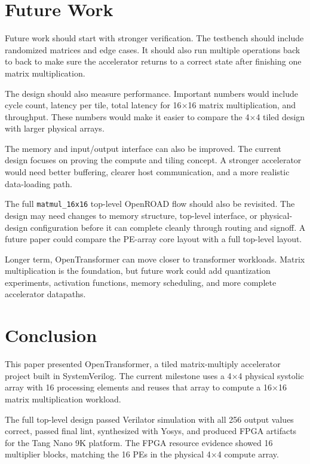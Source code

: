 \documentclass[conference]{IEEEtran}
\begin{document}
\section{Future Work}

Future work should start with stronger verification. The testbench should include randomized matrices and edge cases. It should also run multiple operations back to back to make sure the accelerator returns to a correct state after finishing one matrix multiplication.

The design should also measure performance. Important numbers would include cycle count, latency per tile, total latency for 16$\times$16 matrix multiplication, and throughput. These numbers would make it easier to compare the 4$\times$4 tiled design with larger physical arrays.

The memory and input/output interface can also be improved. The current design focuses on proving the compute and tiling concept. A stronger accelerator would need better buffering, clearer host communication, and a more realistic data-loading path.

The full \texttt{matmul\_16x16} top-level OpenROAD flow should also be revisited. The design may need changes to memory structure, top-level interface, or physical-design configuration before it can complete cleanly through routing and signoff. A future paper could compare the PE-array core layout with a full top-level layout.

Longer term, OpenTransformer can move closer to transformer workloads. Matrix multiplication is the foundation, but future work could add quantization experiments, activation functions, memory scheduling, and more complete accelerator datapaths.

\section{Conclusion}

This paper presented OpenTransformer, a tiled matrix-multiply accelerator project built in SystemVerilog. The current milestone uses a 4$\times$4 physical systolic array with 16 processing elements and reuses that array to compute a 16$\times$16 matrix multiplication workload.

The full top-level design passed Verilator simulation with all 256 output values correct, passed final lint, synthesized with Yosys, and produced FPGA artifacts for the Tang Nano 9K platform. The FPGA resource evidence showed 16 multiplier blocks, matching the 16 PEs in the physical 4$\times$4 compute array.
\end{document}
